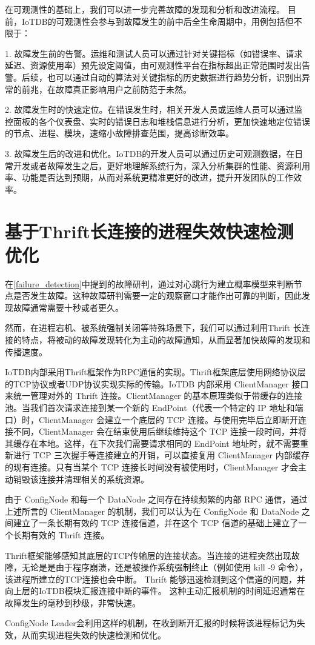 在可观测性的基础上，我们可以进一步完善故障的发现和分析和改进流程。
目前，IoTDB的可观测性会参与到故障发生的前中后全生命周期中，用例包括但不限于：

1. 故障发生前的告警。运维和测试人员可以通过针对关键指标（如错误率、请求延迟、资源使用率）预先设定阈值，由可观测性平台在指标超出正常范围时发出告警。后续，也可以通过自动的算法对关键指标的历史数据进行趋势分析，识别出异常的前兆，在故障真正影响用户之前防范于未然。

2. 故障发生时的快速定位。在错误发生时，相关开发人员或运维人员可以通过监控面板的各个仪表盘、实时的错误日志和堆栈信息进行分析，更加快速地定位错误的节点、进程、模块，速缩小故障排查范围，提高诊断效率。

3. 故障发生后的改进和优化。IoTDB的开发人员可以通过历史可观测数据，在日常开发或者故障发生之后，更好地理解系统行为，深入分析集群的性能、资源利用率、功能是否达到预期，从而对系统更精准更好的改进，提升开发团队的工作效率。


\section{基于Thrift长连接的进程失效快速检测优化}

在\ref{failure_detection}中提到的故障研判，通过对心跳行为建立概率模型来判断节点是否发生故障。这种故障研判需要一定的观察窗口才能作出可靠的判断，因此发现故障通常需要十秒或者更久。

然而，在进程宕机、被系统强制关闭等特殊场景下，我们可以通过利用Thrift 长连接的特点，将被动的故障发现转化为主动的故障通知，从而显著加快故障的发现和传播速度。

IoTDB内部采用Thrift\cite{slee2007thrift}框架作为RPC通信的实现。Thrift框架底层使用网络协议层的TCP协议或者UDP协议实现实际的传输。IoTDB 内部采用 ClientManager 接口来统一管理对外的 Thrift 连接。ClientManager 的基本原理类似于带缓存的连接池。当我们首次请求连接到某一个新的 EndPoint（代表一个特定的 IP 地址和端口）时，ClientManager 会建立一个底层的 TCP 连接。与使用完毕后立即断开连接不同，ClientManager 会在结束使用后继续维持这个 TCP 连接一段时间，并将其缓存在本地。这样，在下次我们需要请求相同的 EndPoint 地址时，就不需要重新进行 TCP 三次握手等连接建立的开销，可以直接复用 ClientManager 内部缓存的现有连接。只有当某个 TCP 连接长时间没有被使用时，ClientManager 才会主动销毁该连接并清理相关的系统资源。

由于 ConfigNode 和每一个 DataNode 之间存在持续频繁的内部 RPC 通信，通过上述所言的 ClientManager 的机制，我们可以认为在 ConfigNode 和 DataNode 之间建立了一条长期有效的 TCP 连接信道，并在这个 TCP 信道的基础上建立了一个长期有效的 Thrift 连接。

Thrift框架能够感知其底层的TCP传输层的连接状态。当连接的进程突然出现故障，无论是是由于程序崩溃，还是被操作系统强制终止（例如使用 kill -9 命令），该进程所建立的TCP连接也会中断。
Thrift 能够迅速检测到这个信道的问题，并向上层的IoTDB模块汇报连接中断的事件。
这种主动汇报机制的时间延迟通常在故障发生的毫秒到秒级，非常快速。

ConfigNode Leader会利用这样的机制，在收到断开汇报的时候将该进程标记为失效，从而实现进程失效的快速检测和优化。